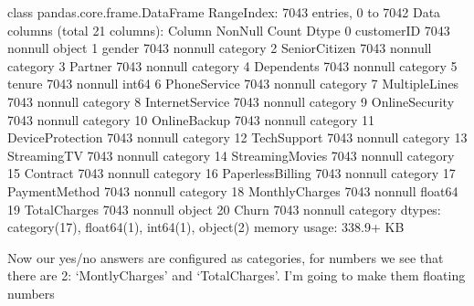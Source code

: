 \documentclass[letterpaper,10pt,english]{jupyterBook}
\begin{document}
\begin{sphinxVerbatim}[commandchars=\\\{\}]
   \PYG{p}{]}\PYG{p}{]}
\end{sphinxVerbatim}

\begin{sphinxVerbatim}[commandchars=\\\{\}]
\PYGZlt{}class \PYGZsq{}pandas.core.frame.DataFrame\PYGZsq{}\PYGZgt{}
RangeIndex: 7043 entries, 0 to 7042
Data columns (total 21 columns):
 \PYGZsh{}   Column            Non\PYGZhy{}Null Count  Dtype   
\PYGZhy{}\PYGZhy{}\PYGZhy{}  \PYGZhy{}\PYGZhy{}\PYGZhy{}\PYGZhy{}\PYGZhy{}\PYGZhy{}            \PYGZhy{}\PYGZhy{}\PYGZhy{}\PYGZhy{}\PYGZhy{}\PYGZhy{}\PYGZhy{}\PYGZhy{}\PYGZhy{}\PYGZhy{}\PYGZhy{}\PYGZhy{}\PYGZhy{}\PYGZhy{}  \PYGZhy{}\PYGZhy{}\PYGZhy{}\PYGZhy{}\PYGZhy{}   
 0   customerID        7043 non\PYGZhy{}null   object  
 1   gender            7043 non\PYGZhy{}null   category
 2   SeniorCitizen     7043 non\PYGZhy{}null   category
 3   Partner           7043 non\PYGZhy{}null   category
 4   Dependents        7043 non\PYGZhy{}null   category
 5   tenure            7043 non\PYGZhy{}null   int64   
 6   PhoneService      7043 non\PYGZhy{}null   category
 7   MultipleLines     7043 non\PYGZhy{}null   category
 8   InternetService   7043 non\PYGZhy{}null   category
 9   OnlineSecurity    7043 non\PYGZhy{}null   category
 10  OnlineBackup      7043 non\PYGZhy{}null   category
 11  DeviceProtection  7043 non\PYGZhy{}null   category
 12  TechSupport       7043 non\PYGZhy{}null   category
 13  StreamingTV       7043 non\PYGZhy{}null   category
 14  StreamingMovies   7043 non\PYGZhy{}null   category
 15  Contract          7043 non\PYGZhy{}null   category
 16  PaperlessBilling  7043 non\PYGZhy{}null   category
 17  PaymentMethod     7043 non\PYGZhy{}null   category
 18  MonthlyCharges    7043 non\PYGZhy{}null   float64 
 19  TotalCharges      7043 non\PYGZhy{}null   object  
 20  Churn             7043 non\PYGZhy{}null   category
dtypes: category(17), float64(1), int64(1), object(2)
memory usage: 338.9+ KB
\end{sphinxVerbatim}

\sphinxAtStartPar
Now our yes/no answers are configured as categories, for numbers we see that there are 2: ‘MontlyCharges’ and ‘TotalCharges’.
I’m going to make them floating numbers
\end{document}

